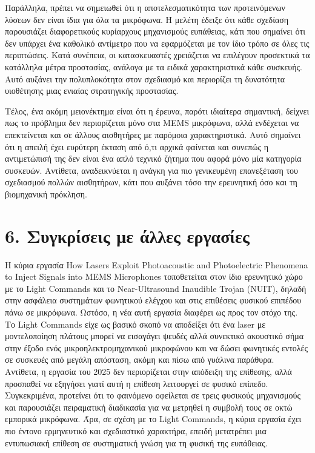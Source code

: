 \documentclass[12pt,a4paper]{report}
\begin{document}
	Παράλληλα, πρέπει να σημειωθεί ότι η αποτελεσματικότητα των προτεινόμενων λύσεων δεν είναι ίδια για όλα τα μικρόφωνα. Η μελέτη έδειξε ότι κάθε σχεδίαση παρουσιάζει διαφορετικούς κυρίαρχους μηχανισμούς ευπάθειας, κάτι που σημαίνει ότι δεν υπάρχει ένα καθολικό αντίμετρο που να εφαρμόζεται με τον ίδιο τρόπο σε όλες τις περιπτώσεις. Κατά συνέπεια, οι κατασκευαστές χρειάζεται να επιλέγουν προσεκτικά τα κατάλληλα μέτρα προστασίας, ανάλογα με τα ειδικά χαρακτηριστικά κάθε συσκευής. Αυτό αυξάνει την πολυπλοκότητα στον σχεδιασμό και περιορίζει τη δυνατότητα υιοθέτησης μιας ενιαίας στρατηγικής προστασίας.
	
	Τέλος, ένα ακόμη μειονέκτημα είναι ότι η έρευνα, παρότι ιδιαίτερα σημαντική, δείχνει πως το πρόβλημα δεν περιορίζεται μόνο στα MEMS μικρόφωνα, αλλά ενδέχεται να επεκτείνεται και σε άλλους αισθητήρες με παρόμοια χαρακτηριστικά. Αυτό σημαίνει ότι η απειλή έχει ευρύτερη έκταση από ό,τι αρχικά φαίνεται και συνεπώς η αντιμετώπισή της δεν είναι ένα απλό τεχνικό ζήτημα που αφορά μόνο μία κατηγορία συσκευών. Αντίθετα, αναδεικνύεται η ανάγκη για πιο γενικευμένη επανεξέταση του σχεδιασμού πολλών αισθητήρων, κάτι που αυξάνει τόσο την ερευνητική όσο και τη βιομηχανική πρόκληση.
	
	

	\chapter*{6. Συγκρίσεις με άλλες εργασίες}
	
	\vspace{0.3cm}
	
	
	Η κύρια εργασία How Lasers Exploit Photoacoustic and Photoelectric Phenomena to Inject Signals into MEMS Microphones τοποθετείται στον ίδιο ερευνητικό χώρο με το Light Commands και το Near-Ultrasound Inaudible Trojan (NUIT), δηλαδή στην ασφάλεια συστημάτων φωνητικού ελέγχου και στις επιθέσεις φυσικού επιπέδου πάνω σε μικρόφωνα. Ωστόσο, η νέα αυτή εργασία διαφέρει ως προς τον στόχο της. Το Light Commands είχε ως βασικό σκοπό να αποδείξει ότι ένα laser με μοντελοποίηση πλάτους μπορεί να εισαγάγει ψευδές αλλά συνεκτικό ακουστικό σήμα στην έξοδο ενός μικροηλεκτρομηχανικού μικροφώνου και να δώσει φωνητικές εντολές σε συσκευές από μεγάλη απόσταση, ακόμη και πίσω από γυάλινα παράθυρα. Αντίθετα, η εργασία του 2025 δεν περιορίζεται στην απόδειξη της επίθεσης, αλλά προσπαθεί να εξηγήσει γιατί αυτή η επίθεση λειτουργεί σε φυσικό επίπεδο. Συγκεκριμένα, προτείνει ότι το φαινόμενο οφείλεται σε τρεις φυσικούς μηχανισμούς και παρουσιάζει πειραματική διαδικασία για να μετρηθεί η συμβολή τους σε οκτώ εμπορικά  μικρόφωνα. Άρα, σε σχέση με το Light Commands, η κύρια εργασία έχει πιο έντονο ερμηνευτικό και σχεδιαστικό χαρακτήρα, επειδή μετατρέπει μια εντυπωσιακή επίθεση σε συστηματική γνώση για τη φυσική της ευπάθειας.
	
\end{document}
